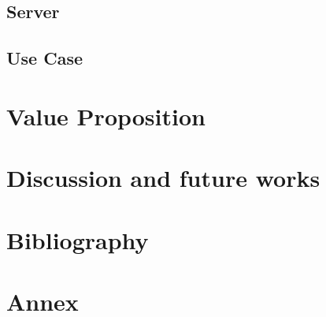 \documentclass[12pt]{article}
\begin{document}
\subsection{Server}

\subsection{Use Case}

\section{Value Proposition}

\section{Discussion and future works}

\section{Bibliography}

\section{Annex}
\end{document}
